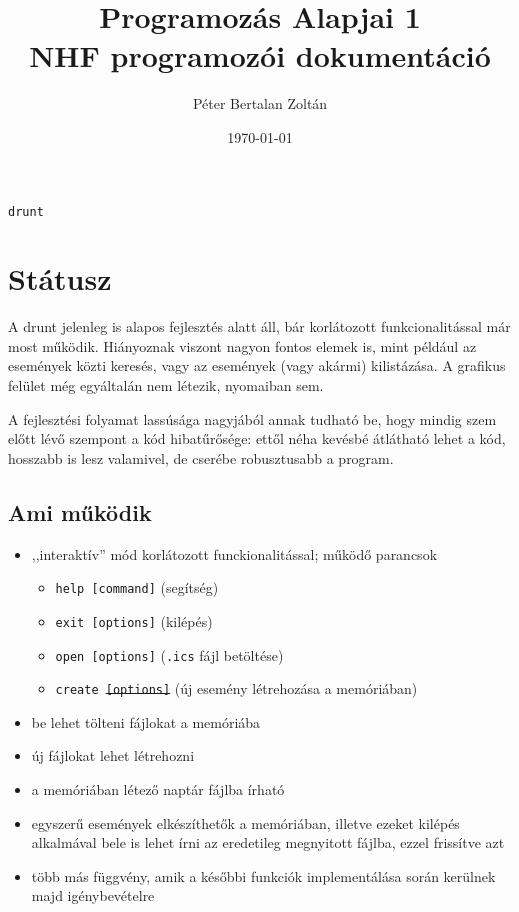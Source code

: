 \documentclass[a4paper]{article}
\title{Programozás Alapjai 1 \\ NHF programozói dokumentáció}
\author{Péter Bertalan Zoltán}
\date{\today}
\begin{document}
	\begin{titlepage}
		\maketitle
		\vspace{4cm}
		\begin{center}
			\Huge
			\texttt{drunt}
		\end{center}
	\end{titlepage}

\section{Státusz}

A drunt jelenleg is alapos fejlesztés alatt áll, bár korlátozott funkcionalitással már most működik. Hiányoznak viszont nagyon fontos elemek is, mint például az események közti keresés, vagy az események (vagy akármi) kilistázása. A grafikus felület még egyáltalán nem létezik, nyomaiban sem.

A fejlesztési folyamat lassúsága nagyjából annak tudható be, hogy mindig szem előtt lévő szempont a kód hibatűrősége: ettől néha kevésbé átlátható lehet a kód, hosszabb is lesz valamivel, de cserébe robusztusabb a program.

\subsection{Ami működik}
\begin{itemize}
	\item ,,interaktív'' mód korlátozott funckionalitással; működő parancsok
	\begin{itemize}
		\item \texttt{help [command]} (segítség)
		\item \texttt{exit [options]} (kilépés)
		\item \texttt{open [options]} (\texttt{.ics} fájl betöltése)
		\item \texttt{create \sout{[options]}} (új esemény létrehozása a memóriában)
	\end{itemize}
	\item be lehet tölteni fájlokat a memóriába
	\item új fájlokat lehet létrehozni
	\item a memóriában létező naptár fájlba írható
	\item egyszerű események elkészíthetők a memóriában, illetve ezeket kilépés alkalmával bele is lehet írni az eredetileg megnyitott fájlba, ezzel frissítve azt
	\item több más függvény, amik a későbbi funkciók implementálása során kerülnek majd igénybevételre
\end{itemize}
\end{document}

